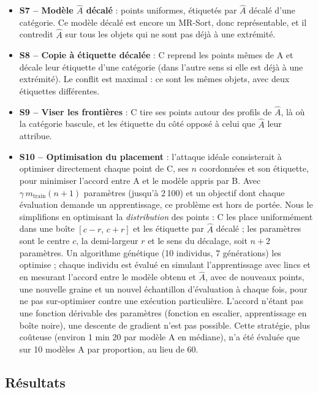 \documentclass[11pt,a4paper]{article}
\begin{document}
\begin{itemize}
  \item \textbf{S7 -- Modèle $\hat{A}$ décalé} : points uniformes, étiquetés par $\hat{A}$ décalé d'une catégorie. Ce
        modèle décalé est encore un MR-Sort, donc représentable, et il contredit $\hat{A}$ sur tous les objets qui
        ne sont pas déjà à une extrémité.
  \item \textbf{S8 -- Copie à étiquette décalée} : C reprend les points mêmes de A et décale leur étiquette d'une
        catégorie (dans l'autre sens si elle est déjà à une extrémité). Le conflit est maximal : ce sont les
        mêmes objets, avec deux étiquettes différentes.
  \item \textbf{S9 -- Viser les frontières} : C tire ses points autour des profils de $\hat{A}$, là où la catégorie
        bascule, et les étiquette du côté opposé à celui que $\hat{A}$ leur attribue.
  \item \textbf{S10 -- Optimisation du placement} : l'attaque idéale consisterait à optimiser directement
        chaque point de C, ses $n$ coordonnées et son étiquette, pour minimiser l'accord entre A et le modèle
        appris par B. Avec $\gamma\,m_{\text{train}}(n+1)$ paramètres (jusqu'à 2\,100) et un objectif dont chaque
        évaluation demande un apprentissage, ce problème est hors de portée. Nous le simplifions en optimisant la
        \emph{distribution} des points : C les place uniformément dans une boîte $[c-r,\,c+r]$ et les étiquette par
        $\hat{A}$ décalé ; les paramètres sont le centre $c$, la demi-largeur $r$ et le sens du décalage, soit
        $n+2$ paramètres. Un algorithme génétique (10 individus, 7 générations) les optimise ; chaque individu est
        évalué en simulant l'apprentissage avec lincs et en mesurant l'accord entre le modèle obtenu et $\hat{A}$, avec de
        nouveaux points, une nouvelle graine et un nouvel échantillon d'évaluation à chaque fois, pour ne pas
        sur-optimiser contre une exécution particulière. L'accord n'étant pas une fonction dérivable des
        paramètres (fonction en escalier, apprentissage en boîte noire), une descente de gradient n'est pas
        possible. Cette stratégie, plus coûteuse (environ 1 min 20 par modèle A en médiane), n'a été
        évaluée que sur 10 modèles A par proportion, au lieu de 60.
\end{itemize}

\subsection{Résultats}
\end{document}
